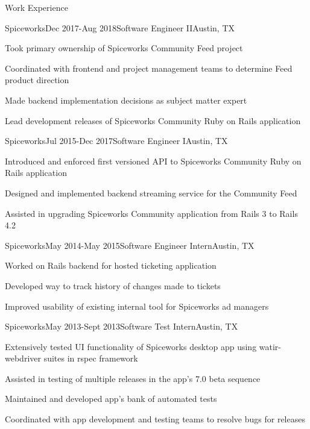 \documentclass{resume} %
\begin{document}

\begin{rSection}{Work Experience}

\begin{rSubsection}{Spiceworks}{Dec 2017-Aug 2018}{Software Engineer II}{Austin, TX}
\item Took primary ownership of Spiceworks Community Feed project
\item Coordinated with frontend and project management teams to determine Feed product direction
\item Made backend implementation decisions as subject matter expert
\item Lead development releases of Spiceworks Community Ruby on Rails application
\end{rSubsection}


\begin{rSubsection}{Spiceworks}{Jul 2015-Dec 2017}{Software Engineer I}{Austin, TX}
\item Introduced and enforced first versioned API to Spiceworks Community Ruby on Rails application
\item Designed and implemented backend streaming service for the Community Feed
\item Assisted in upgrading Spiceworks Community application from Rails 3 to Rails 4.2
\end{rSubsection}


\begin{rSubsection}{Spiceworks}{May 2014-May 2015}{Software Engineer Intern}{Austin, TX}
\item Worked on Rails backend for hosted ticketing application
\item Developed way to track history of changes made to tickets
\item Improved usability of existing internal tool for Spiceworks ad managers
\end{rSubsection}


\begin{rSubsection}{Spiceworks}{May 2013-Sept 2013}{Software Test Intern}{Austin, TX}
\item Extensively tested UI functionality of Spiceworks desktop app using watir-webdriver suites in rspec framework
\item Assisted in testing of multiple releases in the app's 7.0 beta sequence
\item Maintained and developed app's bank of automated tests
\item Coordinated with app development and testing teams to resolve bugs for releases

\end{rSubsection}

\end{rSection}
\end{document}
